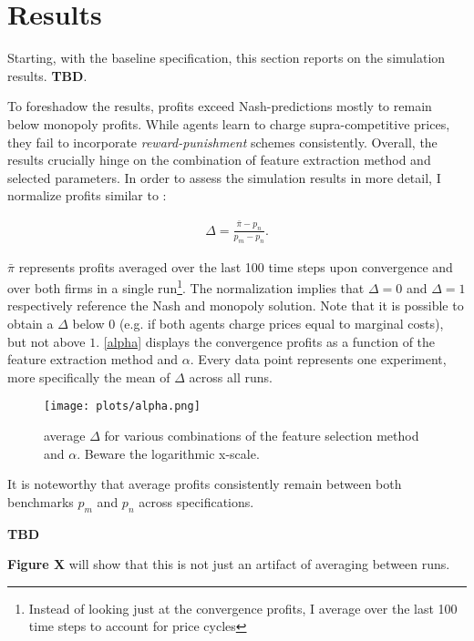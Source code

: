 \section{Results}

Starting, with the baseline specification, this section reports on the simulation results. \textbf{TBD}.

To foreshadow the results, profits exceed Nash-predictions mostly to remain below monopoly profits. While agents learn to charge supra-competitive prices, they fail to incorporate \emph{reward-punishment} schemes consistently.  Overall, the results crucially hinge on the combination of feature extraction method and selected parameters. In order to assess the simulation results in more detail, I normalize profits similar to \textcite{calvano_algorithmic_2018}:

\begin{gather}
\Delta = \frac{\bar{\pi} - p_n}{p_m - p_n}.
\end{gather}

$\bar{\pi}$ represents profits averaged over the last 100 time steps upon convergence and over both firms in a single run\footnote{Instead of looking just at the convergence profits, I average over the last 100 time steps to account for price cycles}. The normalization implies that $\Delta = 0$ and $\Delta = 1$ respectively reference the Nash and monopoly solution. Note that it is possible to obtain a $\Delta$ below $0$ (e.g. if both agents charge prices equal to marginal costs), but not above $1$. \autoref{alpha} displays the convergence profits as a function of the feature extraction method and $\alpha$. Every data point represents one experiment, more specifically the mean of $\Delta$ across all runs.

\begin{figure}
	\texttt{[image: plots/alpha.png]}
	\caption{average $\Delta$ for various combinations of the feature selection method and $\alpha$. Beware the logarithmic x-scale.}
	\label{alpha}
\end{figure}

It is noteworthy that average profits consistently remain between both benchmarks $p_m$ and $p_n$ across specifications.

\textbf{TBD}






\textbf{Figure X} will show that this is not just an artifact of averaging between runs.




